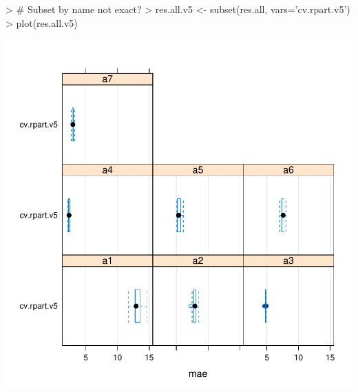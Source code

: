 \documentclass{article}
\begin{document}
\begin{Schunk}
\begin{Sinput}
> # Subset by name not exact?
> res.all.v5 <- subset(res.all, vars='cv.rpart.v5')
> plot(res.all.v5)
\end{Sinput}
\end{Schunk}
\includegraphics{Assignment2-011}
\end{document}
